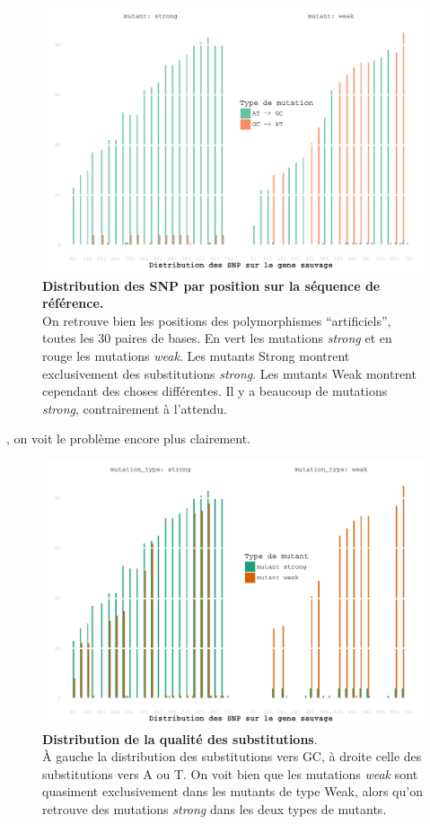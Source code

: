 \documentclass[a4paper]{tufte-handout}
\begin{document}
\begin{figure}[h]
  \centering
  \includegraphics[width=\linewidth]{../substitution_distribution.pdf}
  \caption{\textbf{Distribution des SNP par position sur la séquence de référence.} \\
  On retrouve bien les positions des polymorphismes ``artificiels'', toutes les
  $30$ paires de bases. En vert les mutations \emph{strong} et en rouge les
  mutations \emph{weak}. Les mutants Strong montrent exclusivement des
  substitutions \emph{strong}. Les mutants Weak montrent cependant des
  choses différentes. Il y a beaucoup de mutations \emph{strong}, contrairement
  à l'attendu. 
  }
  \label{figure2}
\end{figure}

, on voit le problème encore plus clairement.  


\begin{figure}[h]
  \centering
  \includegraphics[width=\linewidth]{../muttype_plot.pdf}
  \caption{\textbf{Distribution de la qualité des substitutions}. \\
    À gauche la distribution des substitutions vers GC, à droite celle des
    substitutions vers A ou T. On voit bien que les mutations \emph{weak} sont
    quasiment exclusivement dans les mutants de type Weak, alors qu'on retrouve
    des mutations \emph{strong} dans les deux types de mutants.}
  \label{figure3}
\end{figure}
\end{document}
